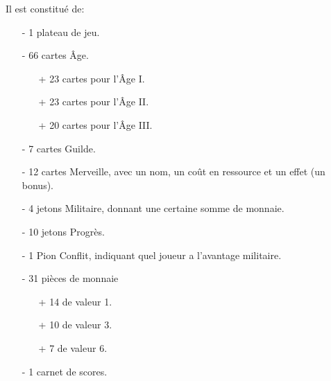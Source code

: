 \documentclass[12pt]{article}
\begin{document}
    	Il est constitué de:
    	\begin{itemize}
    		\item[-] 1 plateau de jeu.
    		\item[-] 66 cartes Âge.
    		\begin{itemize}
    			\item[+] 23 cartes pour l'Âge I.
    			\item[+] 23 cartes pour l'Âge II.
    			\item[+] 20 cartes pour l'Âge III.
    		\end{itemize}
    		\item[-] 7 cartes Guilde.
    		\item[-] 12 cartes Merveille, avec un nom, un coût en ressource et un effet (un bonus).
    		\item[-] 4 jetons Militaire, donnant une certaine somme de monnaie.
    		\item[-] 10 jetons Progrès.
    		\item[-] 1 Pion Conflit, indiquant quel joueur a l'avantage militaire.
    		\item[-] 31 pièces de monnaie
    		\begin{itemize}
    			\item[+] 14 de valeur 1.
    			\item[+] 10 de valeur 3.
    			\item[+] 7 de valeur 6.
    		\end{itemize}
    		\item[-] 1 carnet de scores.
    	\end{itemize}
    
\end{document}
